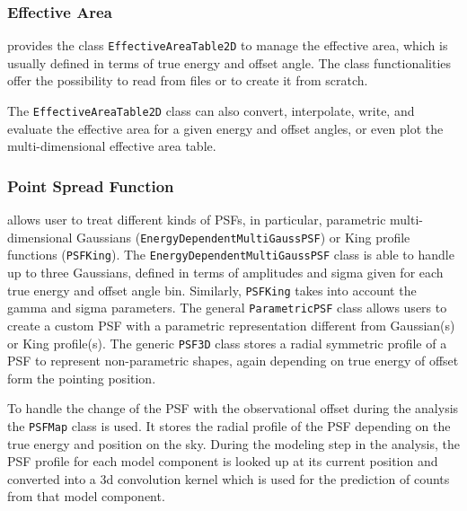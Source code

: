 \documentclass[traditabstract, longauth]{aa}
\newcommand{\code}[1]{\texttt{#1}}
\begin{document}
\subsubsection{Effective Area}
\gammapy provides the class \code{EffectiveAreaTable2D} to
manage the effective area, which is usually defined in terms of true energy and offset angle.
The class functionalities offer the possibility to read from files or to create
it from scratch. {The \code{EffectiveAreaTable2D} class can also convert, interpolate,
write, and evaluate the effective area for a given energy and offset angles, or
even plot the multi-dimensional effective area table.

\subsubsection{Point Spread Function}
\gammapy allows user to treat different kinds of PSFs,
in particular, parametric multi-dimensional Gaussians (\code{EnergyDependentMultiGaussPSF})
or King profile functions (\code{PSFKing}). The \code{EnergyDependentMultiGaussPSF}
class is able to handle up to three
Gaussians, defined in terms of amplitudes and sigma given for each true energy
and offset angle bin. Similarly, \code{PSFKing} takes into account the gamma and
sigma parameters. The general \code{ParametricPSF} class allows users to create a
custom PSF with a parametric representation different from Gaussian(s) or King profile(s).
The generic \code{PSF3D} class stores a radial symmetric profile of a
PSF to represent non-parametric shapes, again depending on true energy
of offset form the pointing position.

To handle the change of the PSF with the observational offset during the analysis 
the \code{PSFMap} class is used. It stores the radial profile of the PSF
depending on the true energy and position on the sky. During the modeling
step in the analysis, the PSF profile for each model component is 
looked up at its current position and converted into a 3d convolution kernel
which is used for the prediction of counts from that model component.


}
\end{document}
